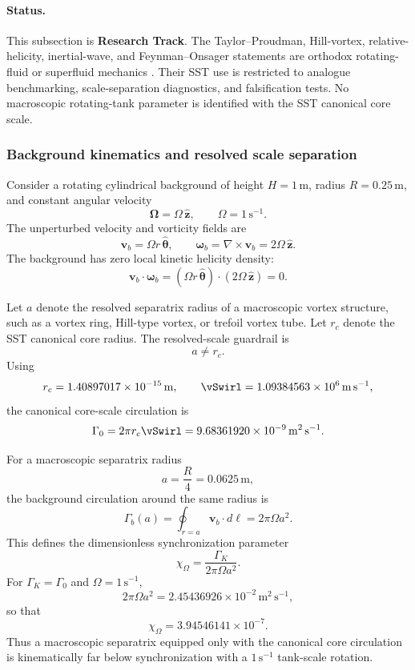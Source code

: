\paragraph{Status.}
This subsection is \textbf{Research Track}.  The Taylor--Proudman,
Hill-vortex, relative-helicity, inertial-wave, and Feynman--Onsager statements
are orthodox rotating-fluid or superfluid mechanics
\cite{Proudman1916,Taylor1922,Batchelor1967,Greenspan1968,Hill1894,Onsager1949,Feynman1955}.
Their SST use is restricted to analogue benchmarking, scale-separation
diagnostics, and falsification tests.  No macroscopic rotating-tank parameter is
identified with the SST canonical core scale.

\subsubsection{Background kinematics and resolved scale separation}

Consider a rotating cylindrical background of height
\(H=1\,\mathrm m\), radius \(R=0.25\,\mathrm m\), and constant angular velocity
\[
\boldsymbol{\Omega}=\Omega\,\hat{\mathbf z},
\qquad
\Omega=1\,\mathrm{s^{-1}}.
\]
The unperturbed velocity and vorticity fields are
\[
\mathbf v_b=\Omega r\,\hat{\boldsymbol\theta},
\qquad
\boldsymbol\omega_b=\nabla\times\mathbf v_b
=2\Omega\,\hat{\mathbf z}.
\]
The background has zero local kinetic helicity density:
\[
\mathbf v_b\cdot\boldsymbol\omega_b
=(\Omega r\,\hat{\boldsymbol\theta})\cdot(2\Omega\,\hat{\mathbf z})=0.
\]

Let \(a\) denote the resolved separatrix radius of a macroscopic vortex
structure, such as a vortex ring, Hill-type vortex, or trefoil vortex tube.
Let \(r_c\) denote the SST canonical core radius.  The resolved-scale guardrail is
\[
\boxed{a\neq r_c.}
\]
Using
\[
r_c=1.40897017\times10^{-15}\,\mathrm m,
\qquad
\vSwirl=1.09384563\times10^6\,\mathrm{m\,s^{-1}},
\]
the canonical core-scale circulation is
\[
\Gamma_0=2\pi r_c\vSwirl
=9.68361920\times10^{-9}\,\mathrm{m^2\,s^{-1}}.
\]

For a macroscopic separatrix radius
\[
a=\frac{R}{4}=0.0625\,\mathrm m,
\]
the background circulation around the same radius is
\[
\Gamma_b(a)=\oint_{r=a}\mathbf v_b\cdot d\boldsymbol\ell
=2\pi\Omega a^2.
\]
This defines the dimensionless synchronization parameter
\[
\boxed{
\chi_\Omega=\frac{\Gamma_K}{2\pi\Omega a^2}.
}
\]
For \(\Gamma_K=\Gamma_0\) and \(\Omega=1\,\mathrm{s^{-1}}\),
\[
2\pi\Omega a^2=2.45436926\times10^{-2}\,\mathrm{m^2\,s^{-1}},
\]
so that
\[
\boxed{
\chi_\Omega=3.94546141\times10^{-7}.
}
\]
Thus a macroscopic separatrix equipped only with the canonical core circulation
is kinematically far below synchronization with a \(1\,\mathrm{s^{-1}}\)
tank-scale rotation.

